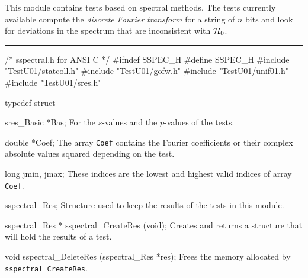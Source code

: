 
This module contains tests based on spectral methods.
%
%
The tests currently available compute the {\em discrete Fourier transform\/}
for a string of $n$ bits and look for deviations in the spectrum
%
that are inconsistent with $\mathcal{H}_0$.
\resdef

\bigskip
\hrule
\code\hide
/* sspectral.h  for ANSI C */
#ifndef SSPEC_H
#define SSPEC_H
\endhide
#include "TestU01/statcoll.h"
#include "TestU01/gofw.h"
#include "TestU01/unif01.h"
#include "TestU01/sres.h"
\endcode

\ifdetailed %

\code
typedef struct {

   sres_Basic *Bas;
\endcode
 \tabb
  For the $s$-values and the $p$-values of the tests.
 \endtabb
\code

   double *Coef;
\endcode
 \tabb  The array {\tt Coef} contains the
  Fourier coefficients or their complex absolute values squared
  depending on the test.
 \endtabb
\code

   long jmin, jmax;
\endcode
 \tabb
  These indices are the lowest and highest valid indices
  of array {\tt Coef}.
 \endtabb
\code

} sspectral_Res;
\endcode
 \tab
  Structure used to keep the results of the tests in this module.
 \endtab
\code


sspectral_Res * sspectral_CreateRes (void);
\endcode
 \tab
  Creates and returns a structure that will hold the results
  of a test.
 \endtab
\code


void sspectral_DeleteRes (sspectral_Res *res);
\endcode
 \tab
  Frees the memory allocated by {\tt sspectral\_CreateRes}.
 \endtab

\fi    %



\code

